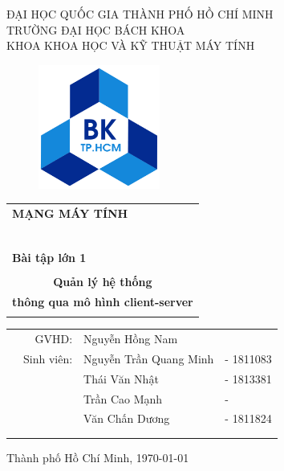 \documentclass[a4paper,11pt]{extarticle}
\begin{document}
\begin{titlepage}
\begin{center}
ĐẠI HỌC QUỐC GIA THÀNH PHỐ HỒ CHÍ MINH \\
TRƯỜNG ĐẠI HỌC BÁCH KHOA \\
KHOA KHOA HỌC VÀ KỸ THUẬT MÁY TÍNH
\end{center}

\vspace{1cm}

\begin{figure}[h!]
\begin{center}
\includegraphics[width=4cm]{hcmut.png}
\end{center}
\end{figure}

\vspace{1cm}


\begin{center}
\begin{tabular}{c}
\multicolumn{1}{l}{\textbf{{\Large MẠNG MÁY TÍNH}}}\\
~~\\
\hline
\\
\multicolumn{1}{l}{\textbf{{\Large Bài tập lớn 1}}}\\
\\
\textbf{{\Huge Quản lý hệ thống }}\\
\textbf{{\Huge thông qua mô hình client-server}}\\
\\
\hline
\end{tabular}
\end{center}

\vspace{1cm}

\begin{table}[h]
\begin{tabular}{rrll}
\hspace{3 cm} & GVHD: & Nguyễn Hồng Nam\\
 & Sinh viên: & Nguyễn Trần Quang Minh & - 1811083 \\
 &          & Thái Văn Nhật	& - 1813381 \\
 &          & Trần Cao Mạnh	& -  \\
 &          & Văn Chấn Dương & - 1811824\\ 
\\
\vspace{2cm}
\end{tabular}
\end{table}

\begin{center}
{\footnotesize Thành phố Hồ Chí Minh,  \monthyeardate\today}
\end{center}
\end{titlepage}
\end{document}
